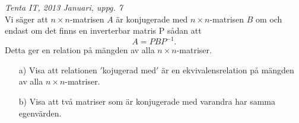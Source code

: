 {\it Tenta IT, 2013 Januari, uppg. 7}\\
Vi säger att $n\times n$-matrisen $A$ är konjugerade med $n\times n$-matrisen $B$ om och endast om det finns en inverterbar matris P sådan att
$$A=PBP^{-1}.$$
Detta ger en relation på mängden av alla $n\times n$-matriser.
\begin{itemize}
	\item[a) ] Visa att relationen $'$kojugerad med$'$ är en ekvivalensrelation på mängden av alla $n\times n$-matriser.
	\item[b) ] Visa att två matriser som är konjugerade med varandra har samma egenvärden.
\end{itemize}
